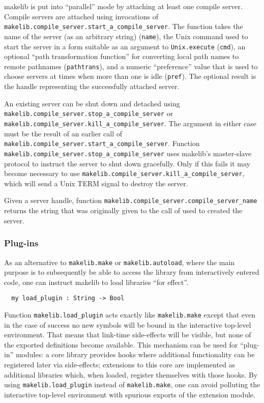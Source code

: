 makelib is put into ``parallel'' mode by attaching at least one compile
server.  Compile servers are attached using invocations of {\tt
makelib.compile_server.start_a_compile_server}.  The function takes the
name of the server (as an arbitrary string) ({\tt name}),
the Unix command used to start the server in a form suitable
as an argument to {\tt Unix.execute} ({\tt cmd}), an optional
``path transformation function'' for converting local path names
to remote pathnames ({\tt pathtrans}), and a numeric ``preference''
value that is used to choose servers at times when more than one
is idle ({\tt pref}).  The optional result is the handle representing
the successfully attached server.

An existing server can be shut down and detached using {\tt
makelib.compile_server.stop_a_compile_server} or {\tt makelib.compile_server.kill_a_compile_server}.
The argument in either case must be the result of an earlier call
of {\tt makelib.compile_server.start_a_compile_server}.
Function {\tt makelib.compile_server.stop_a_compile_server} uses makelib's
master-slave protocol to instruct the server to shut down gracefully.
Only if this fails it may become necessary to use {\tt makelib.compile_server.kill_a_compile_server},
which will send a Unix TERM signal to destroy the server.

Given a server handle, function {\tt makelib.compile_server.compile_server_name}
returns the string that was originally given to the call of used to created the server.

\subsubsection{Plug-ins}

As an alternative to {\tt makelib.make} or {\tt makelib.autoload}, where the
main purpose is to subsequently be able to access the library from
interactively entered code, one can instruct makelib to load libraries
``for effect''.

\begin{verbatim}
  my load_plugin : String -> Bool
\end{verbatim}

Function {\tt makelib.load\_plugin} acts exactly like {\tt makelib.make} except
that even in the case of success no new symbols will be bound in the
interactive top-level environment.  That means that link-time
side-effects will be visible, but none of the exported definitions
become available.  This mechanism can be used for ``plug-in'' modules:
a core library provides hooks where additional functionality can be
registered later via side-effects; extensions to this core are
implemented as additional libraries which, when loaded, register
themselves with those hooks.  By using {\tt makelib.load\_plugin} instead
of {\tt makelib.make}, one can avoid polluting the interactive top-level
environment with spurious exports of the extension module.

